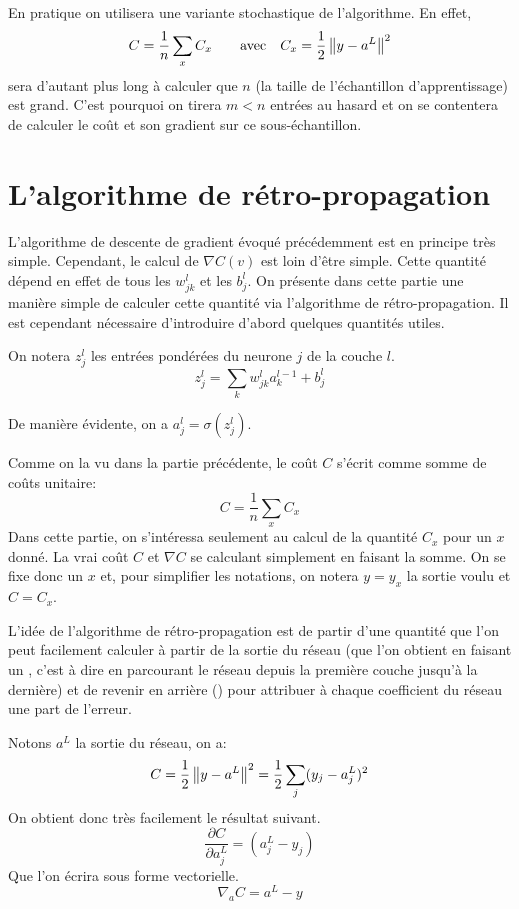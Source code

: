 En pratique on utilisera une variante stochastique de l'algorithme. 
En effet, 
\[
C = \frac{1}{n} \sum_{x} C_x \qquad \text{avec} \quad C_x = \frac{1}{2} \left\Vert y - a^{L}\right\Vert^2
\]
sera d'autant plus long à calculer que $n$ (la taille de l'échantillon d'apprentissage) 
est grand.
C'est pourquoi on tirera $m < n$ entrées au hasard et on se contentera de calculer 
le coût et son gradient sur ce sous-échantillon.



\section{L'algorithme de rétro-propagation}


L'algorithme de descente de gradient évoqué précédemment est en principe 
très simple. Cependant, le calcul de $\nabla C(v)$ est loin d'être simple. 
Cette quantité dépend en effet de tous les $w_{jk}^{l}$ et les $b_{j}^{l}$.
On présente dans cette partie une manière simple de calculer cette quantité 
via l'algorithme de rétro-propagation. 
Il est cependant nécessaire d'introduire d'abord quelques quantités utiles.


\begin{definition}
On notera $z_{j}^{l}$ les entrées pondérées du neurone $j$ de la couche $l$.
\[
z_{j}^{l} = \sum_{k} w_{jk}^{l} a_{k}^{l-1} + b_{j}^{l}
\]
\end{definition}

De manière évidente, on a $a_{j}^{l} = \sigma(z_{j}^{l})$.


Comme on la vu dans la partie précédente, le coût $C$ s'écrit comme somme 
de coûts unitaire:
\[
C = \frac{1}{n} \sum_{x} C_x
\]
Dans cette partie, on s'intéressa seulement au calcul de la quantité $C_x$ pour un $x$ donné. 
La vrai coût $C$ et $\nabla C$ se calculant simplement en faisant la somme.
On se fixe donc un $x$ et, pour simplifier les notations, on notera $y = y_x$ 
la sortie voulu et $C = C_x$.

L'idée de l'algorithme de rétro-propagation est de partir d'une quantité que 
l'on peut facilement calculer à partir de la sortie du réseau (que l'on obtient 
en faisant un , c'est à dire en parcourant le réseau depuis la 
première couche jusqu'à la dernière) et de revenir en arrière () 
pour attribuer à chaque coefficient du réseau une part de l'erreur.

Notons $a^L$ la sortie du réseau, on a:
\[
C = \frac{1}{2} \left\Vert y - a^L\right\Vert^2 = \frac{1}{2} \sum_{j} (y_j - a_{j}^{L})^2
\]
On obtient donc très facilement le résultat suivant.
\[
\frac{\partial C}{\partial a_{j}^{L}} = (a_{j}^{L} - y_j)
\]
Que l'on écrira sous forme vectorielle.
\[
\nabla_a C = a^{L} - y 
\]

